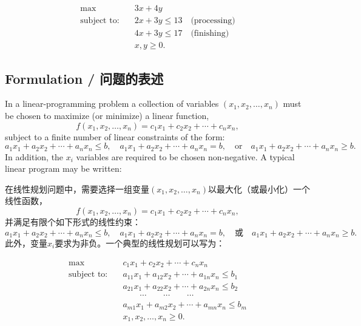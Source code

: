 \[
\begin{aligned}
\max \quad & 3x + 4y \\
\text{subject to:} \quad & 2x + 3y \le 13 \quad \text{(processing)} \\
& 4x + 3y \le 17 \quad \text{(finishing)} \\
& x, y \ge 0.
\end{aligned}
\]

\subsection{Formulation / 问题的表述}

\begin{original}
In a linear-programming problem a collection of variables $(x_1, x_2,\ldots, x_n)$ must be chosen to maximize (or minimize) a linear function,
\[
f(x_1, x_2,\ldots, x_n) = c_1 x_1 + c_2 x_2 + \cdots + c_n x_n,
\]
subject to a finite number of linear constraints of the form:
\[
a_1 x_1 + a_2 x_2 + \cdots + a_n x_n \le b,\quad a_1 x_1 + a_2 x_2 + \cdots + a_n x_n = b,\quad \text{or}\quad a_1 x_1 + a_2 x_2 + \cdots + a_n x_n \ge b.
\]
In addition, the $x_i$ variables are required to be chosen non-negative. A typical linear program may be written:
\end{original}
\begin{translation}
在线性规划问题中，需要选择一组变量$(x_1, x_2,\ldots, x_n)$以最大化（或最小化）一个线性函数，
\[
f(x_1, x_2,\ldots, x_n) = c_1 x_1 + c_2 x_2 + \cdots + c_n x_n,
\]
并满足有限个如下形式的线性约束：
\[
a_1 x_1 + a_2 x_2 + \cdots + a_n x_n \le b,\quad a_1 x_1 + a_2 x_2 + \cdots + a_n x_n = b,\quad \text{或}\quad a_1 x_1 + a_2 x_2 + \cdots + a_n x_n \ge b.
\]
此外，变量$x_i$要求为非负。一个典型的线性规划可以写为：
\end{translation}

\[
\begin{aligned}
\max \quad & c_1 x_1 + c_2 x_2 + \cdots + c_n x_n \\
\text{subject to:} \quad & a_{11}x_1 + a_{12}x_2 + \cdots + a_{1n}x_n \le b_1 \\
& a_{21}x_1 + a_{22}x_2 + \cdots + a_{2n}x_n \le b_2 \\
& \qquad \cdots \qquad \cdots \qquad \cdots \\
& a_{m1}x_1 + a_{m2}x_2 + \cdots + a_{mn}x_n \le b_m \\
& x_1, x_2, \ldots, x_n \ge 0.
\end{aligned}
\]

